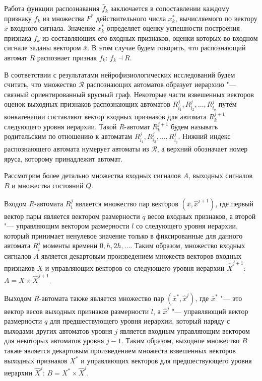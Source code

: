 \documentclass[a4paper, 12pt]{article}
\theoremstyle{plain}
\begin{document}
	Работа функции распознавания $\hat f_k$ заключается в сопоставлении каждому признаку $f_k$ из множества $F^*$ действительного числа $x_k^*$, вычисляемого по вектору $\bar x$ входного сигнала. Значение $x_k^*$ определяет оценку успешности построения признака $f_k$ из составляющих его входных признаков, оценки которых во входном сигнале заданы вектором $\bar x$. В этом случае будем говорить, что распознающий автомат $R$ распознает признак $f_k$: $f_k\dashv R$.
	
	В соответствии с результатами нейрофизиологических исследований \cite{Felleman1991} будем считать, что множество  $\mathcal R$ распознающих автоматов образует иерархию "--- связный ориентированный ярусный граф. Некоторые части взвешенных векторов оценок выходных признаков распознающих автоматов $R_{i_1}^j,R_{i_2}^j,\dots,R_{i_q}^j$ путём конкатенации составляют вектор входных признаков для  автомата $R_k^{j+1}$ следующего уровня иерархии. Такой $R$-автомат $R_k^{j+1}$ будем называть родительским по отношению к автоматам $R_{i_1}^j,R_{i_2}^j,\dots,R_{i_q}^j$. Нижний индекс распознающего автомата нумерует автоматы из $\mathcal R$, а верхний обозначает номер яруса, которому принадлежит автомат.
		
	Рассмотрим более детально множества входных сигналов $A$, выходных сигналов $B$ и множества состояний $Q$.
	
	Входом $R$-автомата $R_i^j$ является множество пар векторов $(\bar x,\hat x^{j+1})$, где первый вектор пары является вектором размерности $q$ весов входных признаков, а второй "--- управляющим вектором размерности $l$ со следующего уровня иерархии, который принимает ненулевое значение только в фиксированные для данного автомата $R_i^j$ моменты времени $0,h,2h,\dots$. Таким образом, множество входных сигналов $A$ является декартовым произведением множеств векторов входных признаков $X$ и управляющих векторов со следующего уровня иерархии $\hat X^{j+1}$: $A=X\times \hat X^{j+1}$. 
	
	Выходом $R$-автомата также является множество пар $(\bar x^*,\hat x^j)$, где $\bar x^*$ "--- это вектор весов выходных признаков размерности $l$, а $\hat x^j$ "--- управляющий вектор размерности $q$ для предшествующего уровня иерархии, который наряду с выходами других автоматов уровня $j$ является входным управляющим вектором для некоторых автоматов уровня $j-1$. Таким образом, выходное множество $B$ также является декартовым произведением множеств взвешенных векторов выходных признаков $X^*$ и управляющих векторов для предшествующего уровня иерархии $\hat X^j$: $B=X^*\times \hat X^j$.
	
\end{document}
